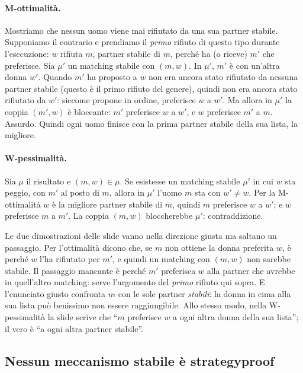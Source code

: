 \paragraph{M-ottimalità.} Mostriamo che nessun uomo viene mai rifiutato da una sua partner
stabile. Supponiamo il contrario e prendiamo il \emph{primo} rifiuto di questo tipo durante
l'esecuzione: $w$ rifiuta $m$, partner stabile di $m$, perché ha (o riceve) $m'$ che
preferisce. Sia $\mu'$ un matching stabile con $(m, w)$. In $\mu'$, $m'$ è con un'altra
donna $w'$. Quando $m'$ ha proposto a $w$ non era ancora stato rifiutato da nessuna partner
stabile (questo è il primo rifiuto del genere), quindi non era ancora stato rifiutato da
$w'$: siccome propone in ordine, preferisce $w$ a $w'$. Ma allora in $\mu'$ la coppia
$(m', w)$ è bloccante: $m'$ preferisce $w$ a $w'$, e $w$ preferisce $m'$ a $m$. Assurdo.
Quindi ogni uomo finisce con la prima partner stabile della sua lista, la migliore.

\paragraph{W-pessimalità.} Sia $\mu$ il risultato e $(m, w) \in \mu$. Se esistesse un
matching stabile $\mu'$ in cui $w$ sta peggio, con $m'$ al posto di $m$, allora in $\mu'$
l'uomo $m$ sta con $w' \ne w$. Per la M-ottimalità $w$ è la migliore partner stabile di
$m$, quindi $m$ preferisce $w$ a $w'$; e $w$ preferisce $m$ a $m'$. La coppia $(m, w)$
bloccherebbe $\mu'$: contraddizione.

\begin{attenzione}
Le due dimostrazioni delle slide vanno nella direzione giusta ma saltano un passaggio. Per
l'ottimalità dicono che, se $m$ non ottiene la donna preferita $w$, è perché $w$ l'ha
rifiutato per $m'$, e quindi un matching con $(m, w)$ non sarebbe stabile. Il passaggio
mancante è perché $m'$ preferisca $w$ alla partner che avrebbe in quell'altro matching:
serve l'argomento del \emph{primo} rifiuto qui sopra. E l'enunciato giusto confronta $m$
con le sole partner \emph{stabili}: la donna in cima alla sua lista può benissimo non
essere raggiungibile. Allo stesso modo, nella W-pessimalità la slide scrive che ``$m$
preferisce $w$ a ogni altra donna della sua lista''; il vero è ``a ogni altra partner
stabile''.
\end{attenzione}

\subsection{Nessun meccanismo stabile è strategyproof}

